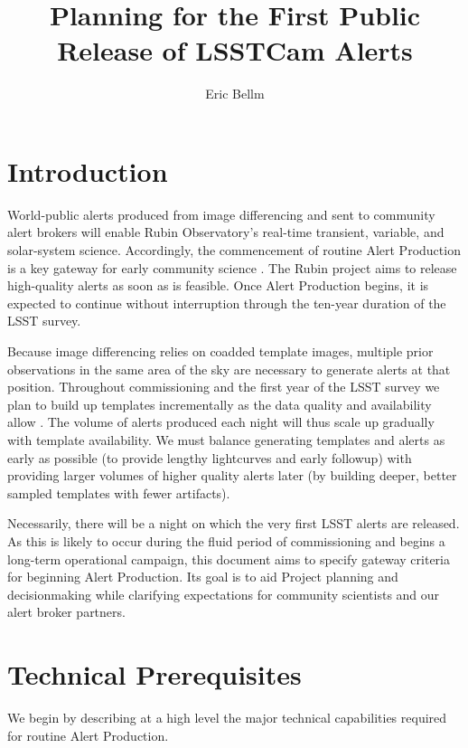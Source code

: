 \documentclass[OPS,authoryear,toc]{lsstdoc}
\title{Planning for the First Public Release of LSSTCam Alerts}
\author{%
Eric Bellm
}
\date{\vcsDate}
\begin{document}
\maketitle

\section{Introduction}

World-public alerts produced from image differencing and sent to community alert brokers will enable Rubin Observatory's real-time transient, variable, and solar-system science.
Accordingly, the commencement of routine Alert Production is a key gateway for early community science .
The Rubin project aims to release high-quality alerts as soon as is feasible.
Once Alert Production begins, it is expected to continue without interruption through the ten-year duration of the LSST survey.

Because image differencing relies on coadded template images, multiple prior observations in the same area of the sky are necessary to generate alerts at that position.
Throughout commissioning and the first year of the LSST survey we plan to build up templates incrementally as the data quality and availability allow .
The volume of alerts produced each night will thus scale up gradually with template availability.
We must balance generating templates and alerts as early as possible (to provide lengthy lightcurves and early followup) with providing larger volumes of higher quality alerts later (by building deeper, better sampled templates with fewer artifacts).

Necessarily, there will be a night on which the very first LSST alerts are released. 
As this is likely to occur during the fluid period of commissioning and begins a long-term operational campaign, this document aims to specify gateway criteria for beginning Alert Production.
Its goal is to aid Project planning and decisionmaking while clarifying expectations for community scientists and our alert broker partners.

\section{Technical Prerequisites}

We begin by describing at a high level the major technical capabilities required for routine Alert Production.
\end{document}
